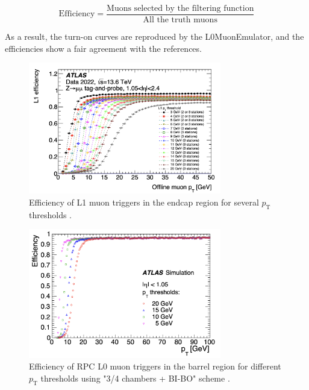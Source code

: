 \begin{equation}
\label{eq:emulator_efficiency}
\mathrm{Efficiency} = \frac{\text{Muons selected by the filtering function}}{\text{All the truth muons}}
\end{equation}

As a result, the turn-on curves are reproduced by the L0MuonEmulator, and the efficiencies show a fair agreement with the references.

\begin{figure}[htbp]
  \centering
  \includegraphics[width=0.75\textwidth]{figs/chapter4/L1Muon_endcap_eff.png}
  \caption{Efficiency of L1 muon triggers in the endcap region for several $p_\mathrm{T}$ thresholds \cite{ATLASRun3Trigger}.}
  \label{fig:L1MuonEndcapEff}
\end{figure}

\begin{figure}[htbp]
  \centering
  \includegraphics[width=0.75\textwidth]{figs/chapter4/L0Muon_barrel_eff.png}
  \caption{Efficiency of RPC L0 muon triggers in the barrel region for different $p_\mathrm{T}$ thresholds using "3/4 chambers + BI-BO" scheme \cite{TDAQ_TDR}.}
  \label{fig:L0MuonBarrelEff}
\end{figure}



